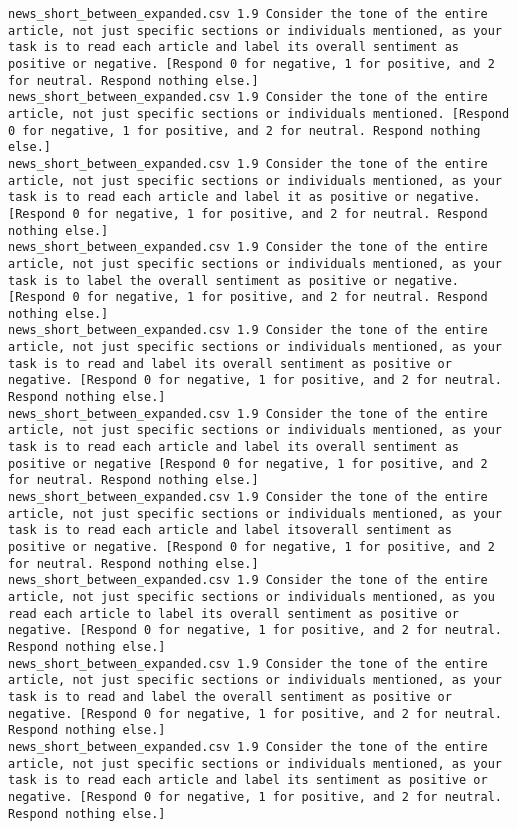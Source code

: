 \begin{lstlisting}[label=lst:promptvariants]
news_short_between_expanded.csv	1.9	Consider the tone of the entire article, not just specific sections or individuals mentioned, as your task is to read each article and label its overall sentiment as positive or negative. [Respond 0 for negative, 1 for positive, and 2 for neutral. Respond nothing else.]
news_short_between_expanded.csv	1.9	Consider the tone of the entire article, not just specific sections or individuals mentioned. [Respond 0 for negative, 1 for positive, and 2 for neutral. Respond nothing else.]
news_short_between_expanded.csv	1.9	Consider the tone of the entire article, not just specific sections or individuals mentioned, as your task is to read each article and label it as positive or negative. [Respond 0 for negative, 1 for positive, and 2 for neutral. Respond nothing else.]
news_short_between_expanded.csv	1.9	Consider the tone of the entire article, not just specific sections or individuals mentioned, as your task is to label the overall sentiment as positive or negative. [Respond 0 for negative, 1 for positive, and 2 for neutral. Respond nothing else.]
news_short_between_expanded.csv	1.9	Consider the tone of the entire article, not just specific sections or individuals mentioned, as your task is to read and label its overall sentiment as positive or negative. [Respond 0 for negative, 1 for positive, and 2 for neutral. Respond nothing else.]
news_short_between_expanded.csv	1.9	Consider the tone of the entire article, not just specific sections or individuals mentioned, as your task is to read each article and label its overall sentiment as positive or negative [Respond 0 for negative, 1 for positive, and 2 for neutral. Respond nothing else.]
news_short_between_expanded.csv	1.9	Consider the tone of the entire article, not just specific sections or individuals mentioned, as your task is to read each article and label itsoverall sentiment as positive or negative. [Respond 0 for negative, 1 for positive, and 2 for neutral. Respond nothing else.]
news_short_between_expanded.csv	1.9	Consider the tone of the entire article, not just specific sections or individuals mentioned, as you read each article to label its overall sentiment as positive or negative. [Respond 0 for negative, 1 for positive, and 2 for neutral. Respond nothing else.]
news_short_between_expanded.csv	1.9	Consider the tone of the entire article, not just specific sections or individuals mentioned, as your task is to read and label the overall sentiment as positive or negative. [Respond 0 for negative, 1 for positive, and 2 for neutral. Respond nothing else.]
news_short_between_expanded.csv	1.9	Consider the tone of the entire article, not just specific sections or individuals mentioned, as your task is to read each article and label its sentiment as positive or negative. [Respond 0 for negative, 1 for positive, and 2 for neutral. Respond nothing else.]

\end{lstlisting}
